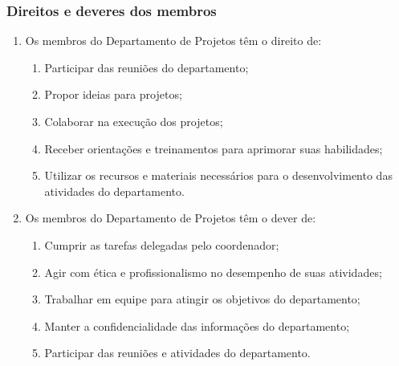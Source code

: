         \subsubsection{Direitos e deveres dos membros}
        \begin{enumerate}
            \item Os membros do Departamento de Projetos têm o direito de:
            \begin{enumerate}
                \item Participar das reuniões do departamento;
                \item Propor ideias para projetos;
                \item Colaborar na execução dos projetos;
                \item Receber orientações e treinamentos para aprimorar suas habilidades;
                \item Utilizar os recursos e materiais necessários para o desenvolvimento das atividades do departamento.
            \end{enumerate} 
            \item  Os membros do Departamento de Projetos têm o dever de:
            \begin{enumerate}
                \item Cumprir as tarefas delegadas pelo coordenador;
                \item Agir com ética e profissionalismo no desempenho de suas atividades;
                \item Trabalhar em equipe para atingir os objetivos do departamento;
                \item Manter a confidencialidade das informações do departamento;
                \item Participar das reuniões e atividades do departamento.
            \end{enumerate}
        \end{enumerate}
    

